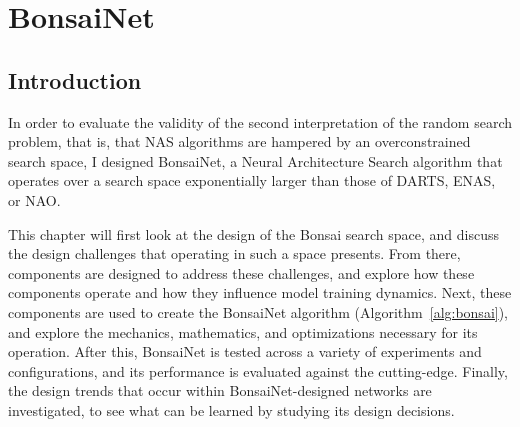 \newtheorem{theorem}{Restriction}[section]
\graphicspath{{Chapters/bonsai/figures/}}
\newcommand{\Mod}[1]{\ (\mathrm{mod}\ #1)}

\chapter{BonsaiNet}

\section{Introduction}
In order to evaluate the validity of the second interpretation of the random search problem, that is, that NAS algorithms
are hampered by an overconstrained search space, I designed BonsaiNet, a Neural Architecture Search algorithm that operates over a search
space exponentially larger than those of DARTS, ENAS, or NAO.

This chapter will first look at the design of the Bonsai search space, and discuss the design challenges that operating
in such a space presents. From there, components are designed to address these challenges, and explore how these components
operate and how they influence model training dynamics. Next, these components are used to create the BonsaiNet algorithm (Algorithm~\ref{alg:bonsai}),
and explore the mechanics, mathematics, and optimizations necessary for its operation. After this, BonsaiNet is tested
across a variety of experiments and configurations, and its performance is evaluated against the cutting-edge.
Finally, the design trends that occur within BonsaiNet-designed networks are investigated, to see what can be learned by studying its
design decisions.

